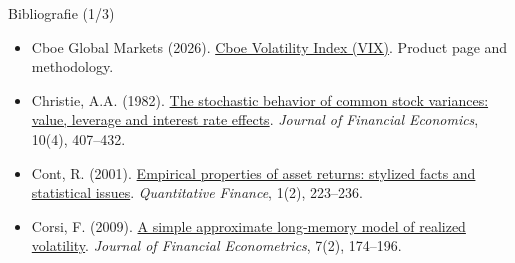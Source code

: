 \begin{frame}{Bibliografie (1/3)}
\begin{itemize}
    \item Cboe Global Markets (2026). \href{https://www.cboe.com/tradable_products/vix/}{Cboe Volatility Index (VIX)}. Product page and methodology.
    \item Christie, A.A. (1982). \href{https://doi.org/10.1016/0304-405X(82)90018-6}{The stochastic behavior of common stock variances: value, leverage and interest rate effects}. \textit{Journal of Financial Economics}, 10(4), 407--432.
    \item Cont, R. (2001). \href{https://doi.org/10.1080/713665670}{Empirical properties of asset returns: stylized facts and statistical issues}. \textit{Quantitative Finance}, 1(2), 223--236.
    \item Corsi, F. (2009). \href{https://doi.org/10.1093/jjfinec/nbp001}{A simple approximate long-memory model of realized volatility}. \textit{Journal of Financial Econometrics}, 7(2), 174--196.
\end{itemize}
\end{frame}

